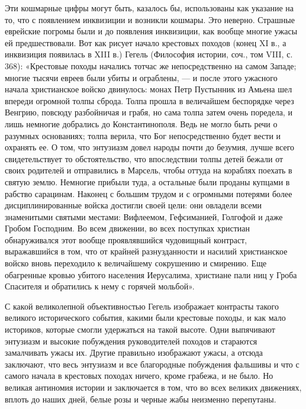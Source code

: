 Эти кошмарные цифры могут быть, казалось бы, использованы как указание
на то,  что с появлением  инквизиции и возникли кошмары.  Это неверно.
Страшные еврейские погромы были и  до появления инквизиции, как вообще
многие  ужасы  ей  предшествовали.  Вот как  рисует  начало  крестовых
походов  (конец  XI в.,  а  инквизиция  появилась  в XIII  в.)  Гегель
(Философия  истории,  соч.,  том  VIII,  с.  368):  «Крестовые  походы
начались  тотчас же  непосредственно  на самом  Западе; многие  тысячи
евреев  были убиты  и ограблены,  ---  и после  этого ужасного  начала
христианское  войско двинулось:  монах  Петр Пустынник  из Амьена  шел
впереди огромной  толпы сброда.  Толпа прошла в  величайшем беспорядке
через  Венгрию,  повсюду разбойничая  и  грабя,  но сама  толпа  затем
очень  поредела, и  лишь немногие  добрались до  Константинополя. Ведь
не  могло быть  речи  о  разумных основаниях;  толпа  верила, что  Бог
непосредственно  будет  вести и  охранять  ее.  О том,  что  энтузиазм
довел  народы  почти  до   безумия,  лучше  всего  свидетельствует  то
обстоятельство, что впоследствии толпы детей бежали от своих родителей
и отправились  в Марсель,  чтобы оттуда на  кораблях поехать  в святую
землю.  Немногие  прибыли  туда,  а  остальные  были  проданы  купцами
в  рабство  сарацинам.   Наконец  с  большим  трудом   и  с  огромными
потерями  более дисциплинированные  войска  достигли  своей цели:  они
овладели  всеми знаменитыми  святыми местами:  Вифлеемом, Гефсиманией,
Голгофой  и  даже   Гробом  Господним.  Во  всем   движении,  во  всех
поступках христиан обнаруживался  этот вообще проявлявшийся чудовищный
контраст,  выражавшийся  в  том,   что  от  крайней  разнузданности  и
насилий христианское войско вновь  переходило к величайшему сокрушению
и  смирению.  Еще  обагренные  кровью  убитого  населения  Иерусалима,
христиане пали  ниц у Гроба  Спасителя и  обратились к нему  с горячей
мольбой».

С какой великолепной объективностью Гегель изображает контрасты такого
великого исторического  события, какими  были крестовые походы,  и как
мало  историков,  которые  смогли  удержаться на  такой  высоте.  Одни
выпячивают  энтузиазм и  высокие  побуждения  руководителей походов  и
стараются замалчивать  ужасы их. Другие правильно  изображают ужасы, а
отсюда  заключают, что  весь  энтузиазм и  все благородные  побуждения
фальшивы  и что  с самого  начала  в крестовых  походах ничего,  кроме
грабежа, и не было. Но великая  антиномия истории и заключается в том,
что во  всех великих  движениях, вплоть  до наших  дней, белые  розы и
черные жабы неизменно перепутаны.

